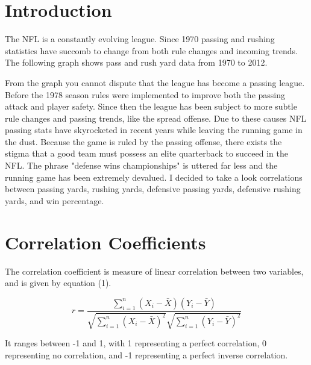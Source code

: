 \documentclass[aps,prl,reprint,groupedaddress]{revtex4-1}
\begin{document}
\section{Introduction}
	The NFL is a constantly evolving league. Since 1970 passing and rushing statistics have succomb to change from both rule changes and incoming trends. The following graph shows pass and rush yard data from 1970 to 2012.


	From the graph you cannot dispute that the league has become a passing league. Before the 1978 season rules were implemented to improve both the passing attack and player safety. Since then the league has been subject to more subtle rule changes and passing trends, like the spread offense. Due to these causes NFL passing stats have skyrocketed in recent years while leaving the running game in the dust.
	Because the game is ruled by the passing offense, there exists the stigma that a good team must possess an elite quarterback to succeed in the NFL. The phrase "defense wins championships" is uttered far less and the running game has been extremely devalued. I decided to take a look correlations between passing yards, rushing yards, defensive passing yards, defensive rushing yards, and win percentage.

\section{Correlation Coefficients}
	The correlation coefficient is measure of linear correlation between two variables, and is given by equation (1).

\begin{equation}
r=\frac{\sum_{i=1}^n \left(X_i-\bar{X} \right) \left(Y_i-\bar{Y} \right)}{\sqrt{\sum_{i=1}^n \left(X_i-\bar{X} \right)^2} \sqrt{\sum_{i=1}^n \left(Y_i-\bar{Y} \right)^2}}
\end{equation}

It ranges between -1 and 1, with 1 representing a perfect correlation, 0 representing no correlation, and -1 representing a perfect inverse correlation.
\end{document}
